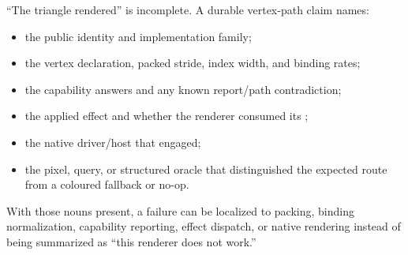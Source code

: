 “The triangle rendered” is incomplete.  A durable vertex-path claim names:

\begin{itemize}
  \item the public identity and implementation family;
  \item the vertex declaration, packed stride, index width, and binding rates;
  \item the capability answers and any known report/path contradiction;
  \item the applied effect and whether the renderer consumed its ;
  \item the native driver/host that engaged;
  \item the pixel, query, or structured oracle that distinguished the expected route from a
        coloured fallback or no-op.
\end{itemize}

With those nouns present, a failure can be localized to packing, binding normalization, capability
reporting, effect dispatch, or native rendering instead of being summarized as “this renderer does
not work.”
